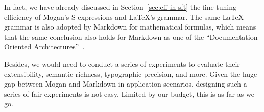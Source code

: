 In fact, we have already discussed in Section~\ref{sec:eff-in-sft} the fine-tuning efficiency of Mogan's S-expressions and \LaTeX{}'s grammar. The same \LaTeX{} grammar is also adopted by Markdown for mathematical formulas, which means that the same conclusion also holds for Markdown as one of the ``Documentation-Oriented Architectures''~\cite{filho_doa_2026}.

Besides, we would need to conduct a series of experiments to evaluate their extensibility, semantic richness, typographic precision, and more. Given the huge gap between Mogan and Markdown in application scenarios, designing such a series of fair experiments is not easy. Limited by our budget, this is as far as we go.
